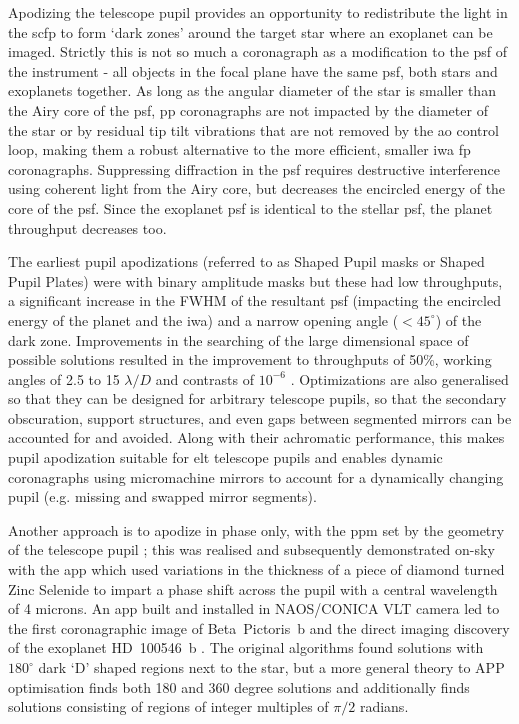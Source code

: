 \documentclass[letterpaper]{ar-1col}
\newcommand{\ld}{$\lambda/D$}
\newcommand{\acc}[1]{\entry{\acs{#1}}{\acl{#1}}}
\begin{document}
Apodizing the telescope pupil provides an opportunity to redistribute the light in the \ac{scfp} to form `dark zones' around the target star where an exoplanet can be imaged.
%
Strictly this is not so much a coronagraph as a modification to the \ac{psf} of the instrument - all objects in the focal plane have the same \ac{psf}, both stars and exoplanets together.
%
As long as the angular diameter of the star is smaller than the Airy core of the \ac{psf}, \ac{pp} coronagraphs are not impacted by the diameter of the star or by residual tip tilt vibrations that are not removed by the \ac{ao} control loop, making them a robust alternative to the more efficient, smaller \ac{iwa} \ac{fp} coronagraphs. 
%
Suppressing diffraction in the \ac{psf} requires destructive interference using coherent light from the Airy core, but decreases the encircled energy of the core of the \ac{psf}.
%
Since the exoplanet \ac{psf} is identical to the stellar \ac{psf}, the planet throughput decreases too.

The earliest pupil apodizations (referred to as Shaped Pupil masks or Shaped Pupil Plates) were with binary amplitude masks \citep{Jacquinot64,Kasdin05} but these had low throughputs, a significant increase in the FWHM of the resultant \ac{psf} (impacting the encircled energy of the planet and the \ac{iwa}) and a narrow opening angle ($<45^\circ$) of the dark zone.
% 
Improvements in the searching of the large dimensional space of possible solutions resulted in the improvement to throughputs of 50\%, working angles of 2.5 to 15 \ld{} and contrasts of $10^{-6}$ \citep{Carlotti11}.
%
Optimizations are also generalised so that they can be designed for arbitrary telescope pupils, so that the secondary obscuration, support structures, and even gaps between segmented mirrors can be accounted for and avoided.
%
Along with their achromatic performance, this makes pupil apodization suitable for \ac{elt} telescope pupils and enables dynamic coronagraphs using micromachine mirrors \citep{Leboulleux22b,Carlotti23} to account for a dynamically changing pupil (e.g. missing and swapped mirror segments).

\begin{armarginnote}[]
\acc{spp}
\acc{app}
\acc{gvapp}
\acc{vvc}
\end{armarginnote}

Another approach is to apodize in phase only, with the \ac{ppm} set by the geometry of the telescope pupil \citep{Codona04}; this was realised and subsequently demonstrated on-sky with the \acl{app} \citep[\acs{app}; ][]{Kenworthy07} which used variations in the thickness of a piece of diamond turned Zinc Selenide to impart a phase shift across the pupil with a central wavelength of 4 microns.
%
An \ac{app} built and installed in NAOS/CONICA VLT camera \citep{Kenworthy10} led to the first coronagraphic image of Beta~Pictoris~b \citep{Quanz10} and the direct imaging discovery of the exoplanet HD~100546~b \citep{Quanz13}.
%
The original algorithms found solutions with $180^\circ$ dark `D' shaped regions next to the star, but a more general theory to APP optimisation \citep{Por17} finds both 180 and 360 degree solutions and additionally finds solutions consisting of regions of integer multiples of $\pi/2$ radians.
\end{document}
